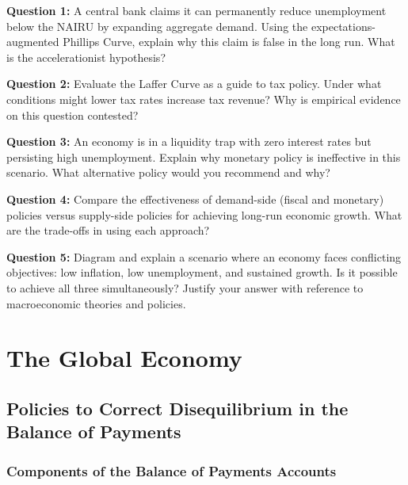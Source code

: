 \documentclass[11pt, a4paper, twoside]{book}
\begin{document}
\begin{exampractice}
\textbf{Question 1:} A central bank claims it can permanently reduce unemployment below the NAIRU by expanding aggregate demand. Using the expectations-augmented Phillips Curve, explain why this claim is false in the long run. What is the accelerationist hypothesis?
\vspace{2.5cm}

\textbf{Question 2:} Evaluate the Laffer Curve as a guide to tax policy. Under what conditions might lower tax rates increase tax revenue? Why is empirical evidence on this question contested?
\vspace{2.5cm}

\textbf{Question 3:} An economy is in a liquidity trap with zero interest rates but persisting high unemployment. Explain why monetary policy is ineffective in this scenario. What alternative policy would you recommend and why?
\vspace{2.5cm}

\textbf{Question 4:} Compare the effectiveness of demand-side (fiscal and monetary) policies versus supply-side policies for achieving long-run economic growth. What are the trade-offs in using each approach?
\vspace{2.5cm}

\textbf{Question 5:} Diagram and explain a scenario where an economy faces conflicting objectives: low inflation, low unemployment, and sustained growth. Is it possible to achieve all three simultaneously? Justify your answer with reference to macroeconomic theories and policies.
\end{exampractice}

\chapter{The Global Economy}

\section{Policies to Correct Disequilibrium in the Balance of Payments}

\subsection{Components of the Balance of Payments Accounts}
\end{document}
